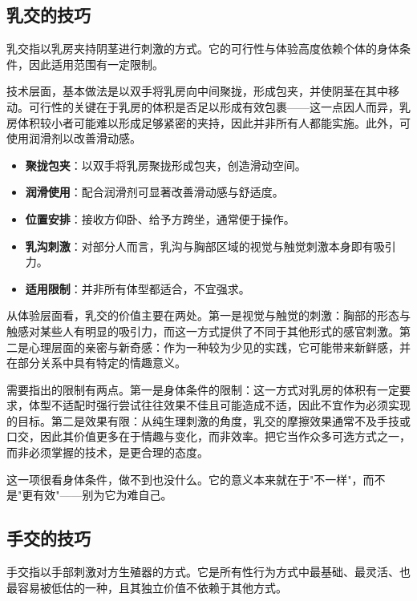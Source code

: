 \documentclass[12pt,UTF8]{ctexbook}
\newcommand{\keyword}[1]{\textbf{#1}}
\begin{document}
\subsection{乳交的技巧}

乳交指以乳房夹持阴茎进行刺激的方式。它的可行性与体验高度依赖个体的身体条件，因此适用范围有一定限制。

技术层面，基本做法是以双手将乳房向中间聚拢，形成包夹，并使阴茎在其中移动。可行性的关键在于乳房的体积是否足以形成有效包裹——这一点因人而异，乳房体积较小者可能难以形成足够紧密的夹持，因此并非所有人都能实施。此外，可使用润滑剂以改善滑动感。

\begin{itemize}
	\item \keyword{聚拢包夹}：以双手将乳房聚拢形成包夹，创造滑动空间。
	\item \keyword{润滑使用}：配合润滑剂可显著改善滑动感与舒适度。
	\item \keyword{位置安排}：接收方仰卧、给予方跨坐，通常便于操作。
	\item \keyword{乳沟刺激}：对部分人而言，乳沟与胸部区域的视觉与触觉刺激本身即有吸引力。
	\item \keyword{适用限制}：并非所有体型都适合，不宜强求。
\end{itemize}

从体验层面看，乳交的价值主要在两处。第一是视觉与触觉的刺激：胸部的形态与触感对某些人有明显的吸引力，而这一方式提供了不同于其他形式的感官刺激。第二是心理层面的亲密与新奇感：作为一种较为少见的实践，它可能带来新鲜感，并在部分关系中具有特定的情趣意义。

需要指出的限制有两点。第一是身体条件的限制：这一方式对乳房的体积有一定要求，体型不适配时强行尝试往往效果不佳且可能造成不适，因此不宜作为必须实现的目标。第二是效果有限：从纯生理刺激的角度，乳交的摩擦效果通常不及手技或口交，因此其价值更多在于情趣与变化，而非效率。把它当作众多可选方式之一，而非必须掌握的技术，是更合理的态度。

\begin{tcolorbox}[colback=pink!5!white,colframe=red!50!black,title=贴心小叮咛]
	这一项很看身体条件，做不到也没什么。它的意义本来就在于"不一样"，而不是"更有效"——别为它为难自己。
\end{tcolorbox}
\subsection{手交的技巧}

手交指以手部刺激对方生殖器的方式。它是所有性行为方式中最基础、最灵活、也最容易被低估的一种，且其独立价值不依赖于其他方式。
\end{document}
